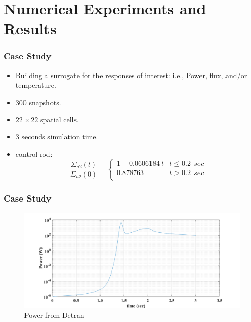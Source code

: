 \documentclass[fleqn]{beamer}
\begin{document}
\section{Numerical Experiments and Results}
\begin{frame}
\frametitle{Case Study}
\begin{itemize}
\item Building a surrogate for the responses of interest: i.e., Power, flux, and/or temperature.

\item 300 snapshots.
\item $22 \times 22$ spatial cells.
\item 3 seconds simulation time.
\item control rod:
\begin{equation*}
    \frac{\Sigma_{a2}(t)}{\Sigma_{a2}(0)}=\left\{
\begin{array}{ll}
1-0.0606184 \ t & t\le 0.2 \ \ sec\\
0.878763 & t>0.2 \ \ sec\\
\end{array} \right. 
\end{equation*}

\end{itemize}
\end{frame}
\begin{frame}
\frametitle{Case Study}
\begin{figure}[ht]
\includegraphics[scale=0.3]{Power.png}
\caption{Power from Detran}
\end{figure}
\end{frame}

\end{document}
